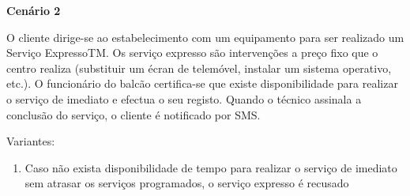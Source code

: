 \documentclass[../relatorio.tex]{subfiles}
\begin{document}
\textbf{Cenário 2} \label{cenario_2}

O cliente dirige-se ao estabelecimento com um equipamento para ser
realizado um Serviço ExpressoTM. Os serviço expresso são intervenções a preço
fixo que o centro realiza (substituir um écran de telemóvel, instalar um sistema
operativo, etc.). O funcionário do balcão certifica-se que existe disponibilidade para realizar o serviço de imediato e efectua o seu registo. Quando o
técnico assinala a conclusão do serviço, o cliente é notificado por SMS.

Variantes:
\begin{enumerate}
    \item Caso não exista disponibilidade de tempo para realizar o serviço de imediato sem atrasar os serviços programados, o serviço expresso é recusado
\end{enumerate}
\end{document}
